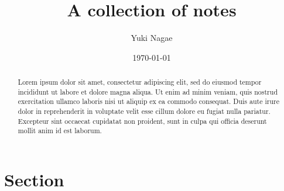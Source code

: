 \documentclass[12pt]{article}
\title{%
\textbf{A collection of notes}
}
\date{\today}
\author{Yuki Nagae}
\begin{document}
\maketitle
\bigskip

\begin{abstract}
Lorem ipsum dolor sit amet, consectetur adipiscing elit, sed do eiusmod tempor incididunt ut labore et dolore magna aliqua. Ut enim ad minim veniam, quis nostrud exercitation ullamco laboris nisi ut aliquip ex ea commodo consequat. Duis aute irure dolor in reprehenderit in voluptate velit esse cillum dolore eu fugiat nulla pariatur. Excepteur sint occaecat cupidatat non proident, sunt in culpa qui officia deserunt mollit anim id est laborum.
\end{abstract}
\newpage

\tableofcontents
\newpage

\section{Section}

\end{document}
